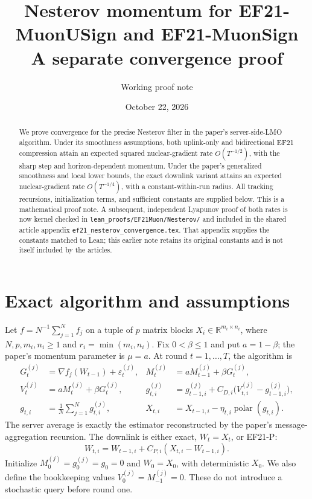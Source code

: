 \documentclass[11pt]{article}
\title{Nesterov momentum for EF21-MuonUSign and EF21-MuonSign\\
\large A separate convergence proof}
\author{Working proof note}
\date{October 22, 2026}
\newcommand{\avg}{\frac1N\sum_{j=1}^N}
\newcommand{\pol}{\operatorname{polar}}
\begin{document}
\maketitle

\begin{abstract}
We prove convergence for the precise Nesterov filter in the paper's
server-side-LMO algorithm. Under its smoothness assumptions, both uplink-only
and bidirectional EF21 compression attain an expected squared nuclear-gradient
rate $O(T^{-1/2})$, with the sharp step and horizon-dependent momentum.
Under the paper's generalized smoothness and local lower bounds, the exact
downlink variant attains an expected nuclear-gradient rate $O(T^{-1/4})$,
with a constant-within-run radius. All tracking recursions, initialization
terms, and sufficient constants are supplied below. This is a mathematical
proof note. A subsequent, independent Lyapunov proof of both rates is now
kernel checked in \texttt{lean\_proofs/EF21Muon/Nesterov/} and included in
the shared article appendix \texttt{ef21\_nesterov\_convergence.tex}.
That appendix supplies the constants matched to Lean; this earlier note
retains its original constants and is not itself included by the articles.
\end{abstract}

\section{Exact algorithm and assumptions}

Let $f=N^{-1}\sum_{j=1}^N f_j$ on a tuple of $p$ matrix blocks
$X_i\in\mathbb R^{m_i\times n_i}$, where $N,p,m_i,n_i\ge1$ and
$r_i=\min(m_i,n_i)$. Fix $0<\beta\le1$ and put $a=1-\beta$;
the paper's momentum parameter is $\mu=a$. At round $t=1,\ldots,T$,
the algorithm is
\begin{align}
 G_t^{(j)}&=\nabla f_j(W_{t-1})+\varepsilon_t^{(j)},
 &M_t^{(j)}&=aM_{t-1}^{(j)}+\beta G_t^{(j)},\label{eq:momentum}\\
 V_t^{(j)}&=aM_t^{(j)}+\beta G_t^{(j)},
 &g_{t,i}^{(j)}&=g_{t-1,i}^{(j)}+
 C_{D,i}\bigl(V_{t,i}^{(j)}-g_{t-1,i}^{(j)}\bigr),\label{eq:nesterov}\\
 g_{t,i}&=\avg g_{t,i}^{(j)},
 &X_{t,i}&=X_{t-1,i}-\eta_{t,i}\pol(g_{t,i}).\label{eq:step}
\end{align}
The server average is exactly the estimator reconstructed by the paper's
message-aggregation recursion. The downlink is either exact, $W_t=X_t$,
or EF21-P:
\begin{equation}\label{eq:downlink}
 W_{t,i}=W_{t-1,i}+C_{P,i}(X_{t,i}-W_{t-1,i}).
\end{equation}
Initialize $M_0^{(j)}=g_0^{(j)}=g_0=0$ and $W_0=X_0$, with deterministic
$X_0$. We also define the bookkeeping values $V_0^{(j)}=M_{-1}^{(j)}=0$.
These do not introduce a stochastic query before round one.
\end{document}
